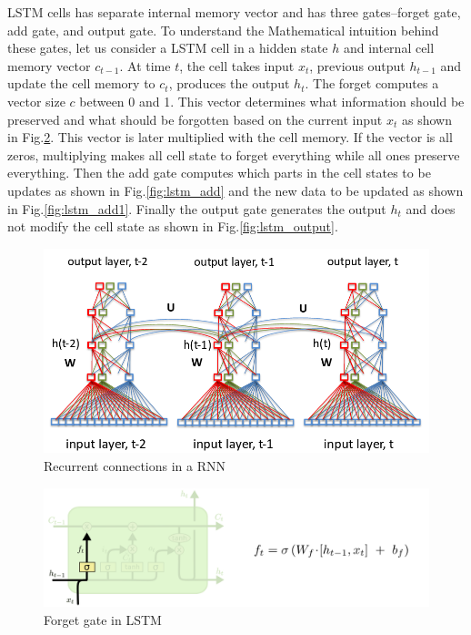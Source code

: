\documentclass[a4paper]{article}
\begin{document}
LSTM cells has separate internal memory vector and has three gates--forget gate,
add gate, and output gate. To understand the Mathematical intuition behind these
gates, let  us consider a  LSTM  cell  in a hidden state  $h$  and internal cell
memory  vector $c_{t-1}$. At  time  $t$,  the  cell  takes input $x_t$, previous
output $h_{t-1}$ and update  the cell memory  to  $c_{t}$,  produces  the output
$h_{t}$. The forget  computes a  vector size $c$ between  0 and  1.  This vector
determines  what information should  be preserved and  what should be  forgotten
based on the current  input  $x_t$  as shown in  Fig.\ref{fig:lstm_forget}. This
vector is later  multiplied with the cell memory. If the vector  is  all  zeros,
multiplying makes all cell state to  forget  everything while  all ones preserve
everything. Then  the  add  gate computes which  parts in the  cell states to be
updates as shown  in Fig.\ref{fig:lstm_add} and the new  data  to  be updated as
shown in Fig.\ref{fig:lstm_add1}. Finally the  output gate generates  the output
$h_t$ and does not modify the cell state as shown in Fig.\ref{fig:lstm_output}.


\begin{figure}
  \includegraphics[width=.99\linewidth]{img/rnn.png}
  \caption{Recurrent connections in a RNN}
  \label{fig:rnn}
\end{figure}


\begin{figure}
  \includegraphics[width=.99\linewidth]{img/lstm_forget.png}
  \caption{Forget gate in LSTM}
  \label{fig:lstm_forget}
\end{figure}
\end{document}
